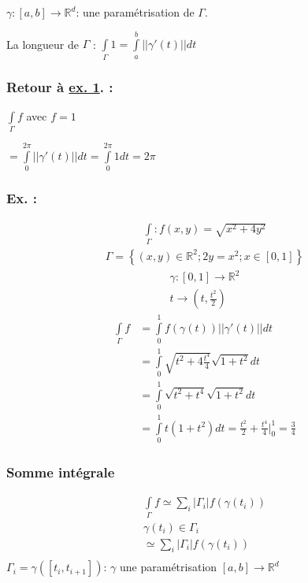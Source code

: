 \documentclass[11pt]{article}
\begin{document}
\(\gamma : \left[a,b\right] \rightarrow \mathbb{R}^d\): une paramétrisation de \(\Gamma\).

La longueur de \(\Gamma\) : \(\int\limits_{\Gamma} 1 = \int\limits_{a}^{b}||\gamma'(t)|| dt\)

\subsubsection{Retour à \hyperref[sec:orgheadline10]{ex. 1}. :}
\label{sec:orgheadline19}
\(\int\limits_{\Gamma}f\) avec \(f=1\)

\(= \int\limits_{0}^{2\pi} ||\gamma'(t)|| dt = \int\limits_{0}^{2\pi} 1 dt = 2\pi\)

\subsubsection{Ex. :}
\label{sec:orgheadline20}
\begin{align*}
\int\limits_{\Gamma} : f(x,y) = \sqrt{x^2+4y^2}
\end{align*}
\begin{align*}
\Gamma = \left\lbrace (x,y) \in \mathbb{R}^2; 2y = x^2; x \in \left[0,1\right]\right\rbrace
\end{align*}
\begin{align*}
\gamma : \left[0,1\right] \rightarrow \mathbb{R}^2\\
t \rightarrow (t,\frac{t^2}{2})
\end{align*}
\begin{align*}
\int\limits_{\Gamma} f &= \int\limits_{0}^{1} f(\gamma(t)) || \gamma'(t)|| dt\\
&= \int\limits_{0}^{1} \sqrt{t^2 + 4 \frac{t^4}{4}} \sqrt{1 + t^2} dt\\
&= \int\limits_{0}^{1} \sqrt{t^2 + t^4} \sqrt{1 + t^2} dt\\
&= \int\limits_{0}^{1} t (1+t^2) dt = \frac{t^2}{2} + \frac{t^4}{4} \big|_0^1= \frac{3}{4} 
\end{align*}

\subsubsection{Somme intégrale}
\label{sec:orgheadline21}

\begin{align*}
\int\limits_{\Gamma}f \simeq \sum\limits_i |\Gamma_i| f(\gamma(t_i))\\
\gamma(t_i) \in \Gamma_i \\
\simeq \sum\limits_i |\Gamma_i| f(\gamma(t_i))\\
\end{align*}
\(\Gamma_i = \gamma \left( \left[ t_i, t_{i+1} \right] \right)\): \(\gamma\) une paramétrisation \(\left[a,b\right] \rightarrow \mathbb{R}^d\)
\end{document}
